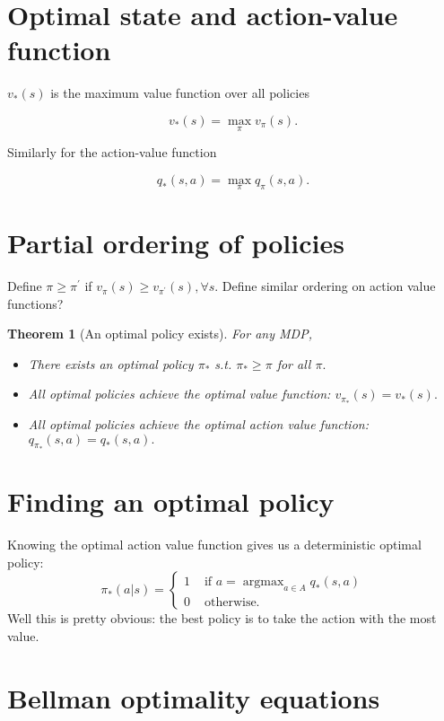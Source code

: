 \documentclass[10pt]{article}
\theoremstyle{plain}
\newtheorem{theorem}{Theorem}
\theoremstyle{definition}
\theoremstyle{remark}
\newcommand{\0}{\varnothing}
\newcommand{\<}{\langle}
\renewcommand{\>}{\rangle}
\begin{document}
\section{Optimal state and action-value function}

\( v _ { * } ( s ) \) is the maximum value function over all policies

\[
v _ { * } ( s ) = \max _ { \pi } v _ { \pi } ( s ).
\]

Similarly for the action-value function

\[
q _ { * } ( s , a ) = \max _ { \pi } q _ { \pi } ( s , a ).
\]

\section{Partial ordering of policies}

Define \( \pi \geq \pi ^ { \prime } \) if \( v _ { \pi } ( s ) \geq v _ { \pi ^ { \prime } } ( s ) , \forall s. \) Define similar ordering on action value functions?

\begin{theorem}[An optimal policy exists]
  For any MDP,
  \begin{itemize}
  \item There exists an optimal policy \( \pi_* \) s.t. \( \pi_* \geq \pi \)
  for all \( \pi. \)
  \item All optimal policies achieve the optimal value function: \( v_{\pi_*}
  (s) = v_*(s). \)
  \item All optimal policies achieve the optimal action value function: \(
  q_{\pi_*} (s, a) = q_*(s, a). \)
  \end{itemize}
\end{theorem}

\section{Finding an optimal policy}

Knowing the optimal action value function gives us a deterministic optimal policy:
\[
\pi _ { * } ( a | s ) = \left\{
  \begin{array} { ll }
  { 1 } & { \text { if } a = \operatorname { argmax }_{a\in A} q_*(s, a) } \\
  { 0 } & { \text { otherwise. } }
  \end{array}
\right.
\]
Well this is pretty obvious: the best policy is to take the action with the most
value.

\section{Bellman optimality equations}
\end{document}
